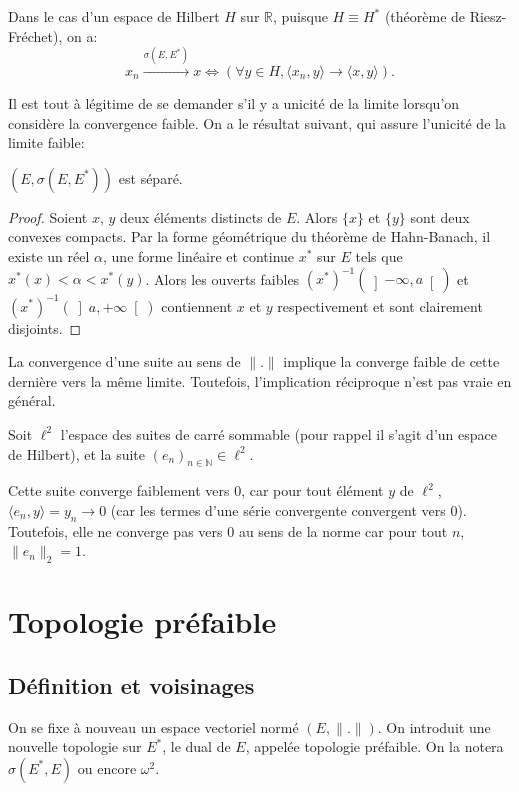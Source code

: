 Dans le cas d'un espace de Hilbert $H$ sur $\mathbb R$, puisque $H\equiv H^*$
(théorème de Riesz-Fréchet), on a:
$$x_n\xrightarrow{\sigma(E, E^*)}x \iff
\left(\forall y\in H, \langle x_n, y\rangle \to \langle x, y\rangle\right).$$

Il est tout à légitime de se demander s'il y a unicité de la limite
lorsqu'on considère la convergence faible. On a le résultat suivant, qui
assure l'unicité de la limite faible:
\begin{prop}
  $(E, \sigma(E, E^*))$ est séparé.
\end{prop}

\begin{proof}
  Soient $x$, $y$ deux éléments distincts de $E$. Alors $\{x\}$ et
  $\{y\}$ sont deux convexes compacts.
  Par la forme géométrique du théorème de Hahn-Banach, il existe
  un réel $\alpha$, une forme linéaire et continue $x^*$ sur $E$
  tels que $x^*(x) < \alpha < x^*(y)$.
  Alors les ouverts faibles $(x^*)^{-1}(\left]-\infty, a\right[)$
  et $(x^*)^{-1}(\left]a, +\infty\right[)$ contiennent $x$
  et $y$ respectivement et sont clairement disjoints.
\end{proof}

\begin{rem}
  La convergence d'une suite au sens de $\|.\|$ implique la converge faible
  de cette dernière vers la même limite. Toutefois, l'implication réciproque
  n'est pas vraie en général.

  Soit $\ell^2$ l'espace des suites de carré sommable
  (pour rappel il s'agit d'un espace
  de Hilbert), et la suite $(e_n)_{n\in\mathbb N}\in \ell^2$.

  Cette suite converge faiblement vers $0$, car pour tout élément
  $y$ de $\ell^2$, $\langle e_n, y\rangle = y_n \to 0$ (car
  les termes d'une série convergente convergent vers $0$).
  Toutefois, elle ne converge pas vers $0$ au sens de la norme
  car pour tout $n$, $\|e_n\|_2 = 1$.
\end{rem}

\section{Topologie préfaible}
\subsection{Définition et voisinages}
On se fixe à nouveau un espace vectoriel normé $(E, \|.\|)$. On introduit
une nouvelle topologie sur $E^*$, le dual de $E$, appelée topologie
préfaible. On la notera $\sigma(E^*, E)$ ou encore $\omega^2$.

